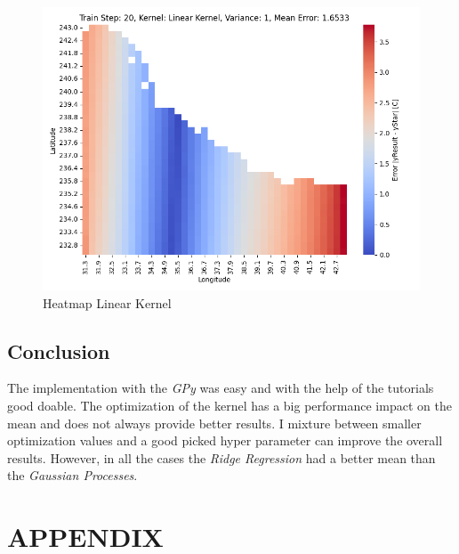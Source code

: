 \documentclass[10pt, a4paper, twocolumn]{article} %
\begin{document}
\begin{figure}[htbp] %
  \centering
  \includegraphics[width=\columnwidth]{pics/TrainStep20_HM_LK.png}
  \caption{Heatmap Linear Kernel}
  \label{fig:fibonacciPlot}
\end{figure}
\subsection{Conclusion}
The implementation with the \textit{GPy} was easy and with the help of the tutorials good doable. The optimization of the kernel has a big performance impact on the mean and does not always provide better results. I mixture between smaller optimization values and a good picked hyper parameter can improve the overall results. However, 
in all the cases the \textit{Ridge Regression} had a better mean than the \textit{Gaussian Processes}. 




\printbibliography[title={Bibliography}] %



\onecolumn\section*{APPENDIX}
\onecolumn
\onecolumn
\onecolumn
\end{document}
